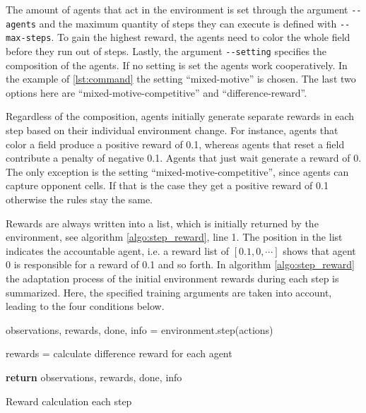 The amount of agents that act in the environment is set through the argument \verb|--agents| and the maximum quantity of steps they can execute is defined with \verb|--max-steps|. To gain the highest reward, the agents need to color the whole field before they run out of steps. Lastly, the argument \verb|--setting| specifies the composition of the agents. If no setting is set the agents work cooperatively. In the example of \ref{lst:command} the setting ``mixed-motive'' is chosen. The last two options here are ``mixed-motive-competitive'' and ``difference-reward''. %

Regardless of the composition, agents initially generate separate rewards in each step based on their individual environment change. For instance, agents that color a field produce a positive reward of 0.1, whereas agents that reset a field contribute a penalty of negative 0.1. Agents that just wait generate a reward of 0. The only exception is the setting ``mixed-motive-competitive'', since agents can capture opponent cells. If that is the case they get a positive reward of 0.1 otherwise the rules stay the same. 

Rewards are always written into a list, which is initially returned by the environment, see algorithm \ref{algo:step_reward}, line 1. The position in the list indicates the accountable agent, i.e. a reward list of $[0.1, 0, \cdots ]$ shows that agent 0 is responsible for a reward of 0.1 and so forth. In algorithm \ref{algo:step_reward} the adaptation process of the initial environment rewards during each step is summarized. Here, the specified training arguments are taken into account, leading to the four conditions below.

\begin{algorithm}[H]
    \DontPrintSemicolon
    observations, rewards, done, info = environment.step(actions)\;

     {
        rewards = calculate difference reward for each agent
    }

    \textbf{return} observations, rewards, done, info\;
    \caption{Reward calculation each step}\label{algo:step_reward}
\end{algorithm}

